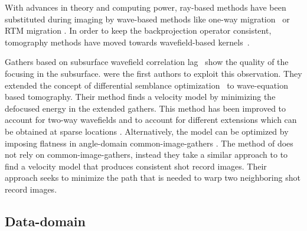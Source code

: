 With advances in theory and computing power, ray-based methods have been substituted
during imaging by wave-based methods like one-way migration~\citep{gazdag:124}
or RTM migration \citep{baysal:1514, whitmore:382, GPR:GPR413}. In order to keep 
the backprojection operator consistent, tomography methods have moved  towards 
wavefield-based kernels~\citep{Woodward_1992,SavaBiondi.gp.wemva1,SavaBiondi.gp.wemva2,
Xie2008FiniteFreqSensitityKernel}. 

Gathers based on subsurface wavefield correlation lag~\citep{rickett:883,sava:S209,GPR:GPR888}
show the quality of the focusing in the subsurface. \cite{ShenSymes.geo.2008} were the first authors
to exploit this observation. They extended 
the concept of differential semblance optimization~\citep{symes.carazzone} to wave-equation
based tomography. Their method finds a velocity model by minimizing the defocused energy in
 the extended gathers. This method has been improved to account for two-way wavefields
\citep{Wiktor,tony_seg:cwp12,Shan:chevron,BiondiAli:2014,diaz2015} and to account 
for different extensions which can be obtained at sparse locations \citep{tony:gp15}. Alternatively,
 the model can be optimized by imposing flatness in angle-domain common-image-gathers
\citep{biondiAngle,ursin,Montel,Liu2010,yiShen}. 
 The method of \cite{perrone2015waveform} does not rely on common-image-gathers, instead they
 take a similar approach to \citep{Alyahya1989VAiterativeProfileMig} to find a velocity 
model that produces consistent shot record images. Their approach seeks to minimize the
path that is needed to warp two neighboring shot record images. 

\subsection{Data-domain}

